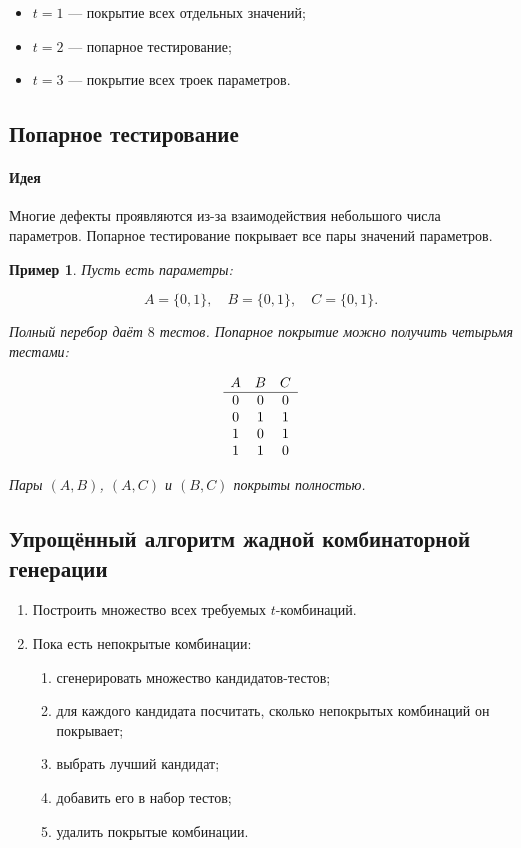 \documentclass[12pt,a4paper]{article}
\newtheorem{example}{Пример}
\begin{document}
\begin{itemize}
    \item $t=1$ --- покрытие всех отдельных значений;
    \item $t=2$ --- попарное тестирование;
    \item $t=3$ --- покрытие всех троек параметров.
\end{itemize}

\subsection{Попарное тестирование}

\paragraph{Идея}

Многие дефекты проявляются из-за взаимодействия небольшого числа параметров. Попарное тестирование покрывает все пары значений параметров.

\begin{example}
Пусть есть параметры:

\[
A=\{0,1\},\quad B=\{0,1\},\quad C=\{0,1\}.
\]

Полный перебор даёт $8$ тестов. Попарное покрытие можно получить четырьмя тестами:

\[
\begin{array}{c c c}
A & B & C\\
\hline
0 & 0 & 0\\
0 & 1 & 1\\
1 & 0 & 1\\
1 & 1 & 0
\end{array}
\]

Пары $(A,B)$, $(A,C)$ и $(B,C)$ покрыты полностью.
\end{example}

\subsection{Упрощённый алгоритм жадной комбинаторной генерации}

\begin{enumerate}
    \item Построить множество всех требуемых $t$-комбинаций.
    \item Пока есть непокрытые комбинации:
    \begin{enumerate}
        \item сгенерировать множество кандидатов-тестов;
        \item для каждого кандидата посчитать, сколько непокрытых комбинаций он покрывает;
        \item выбрать лучший кандидат;
        \item добавить его в набор тестов;
        \item удалить покрытые комбинации.
    \end{enumerate}
\end{enumerate}
\end{document}
